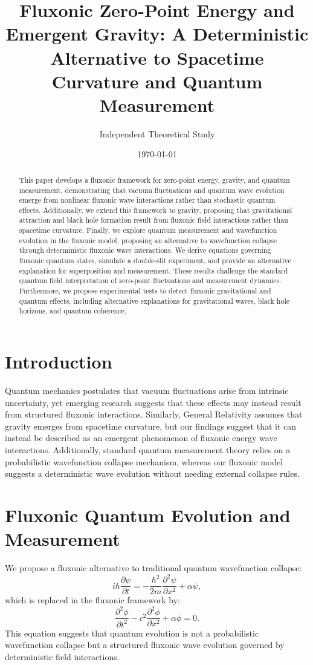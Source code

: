 \documentclass{article}
\title{Fluxonic Zero-Point Energy and Emergent Gravity: A Deterministic Alternative to Spacetime Curvature and Quantum Measurement}
\author{Independent Theoretical Study}
\date{\today}
\begin{document}
\maketitle

\begin{abstract}
This paper develops a fluxonic framework for zero-point energy, gravity, and quantum measurement, demonstrating that vacuum fluctuations and quantum wave evolution emerge from nonlinear fluxonic wave interactions rather than stochastic quantum effects. Additionally, we extend this framework to gravity, proposing that gravitational attraction and black hole formation result from fluxonic field interactions rather than spacetime curvature. Finally, we explore quantum measurement and wavefunction evolution in the fluxonic model, proposing an alternative to wavefunction collapse through deterministic fluxonic wave interactions. We derive equations governing fluxonic quantum states, simulate a double-slit experiment, and provide an alternative explanation for superposition and measurement. These results challenge the standard quantum field interpretation of zero-point fluctuations and measurement dynamics. Furthermore, we propose experimental tests to detect fluxonic gravitational and quantum effects, including alternative explanations for gravitational waves, black hole horizons, and quantum coherence.
\end{abstract}

\section{Introduction}
Quantum mechanics postulates that vacuum fluctuations arise from intrinsic uncertainty, yet emerging research suggests that these effects may instead result from structured fluxonic interactions. Similarly, General Relativity assumes that gravity emerges from spacetime curvature, but our findings suggest that it can instead be described as an emergent phenomenon of fluxonic energy wave interactions. Additionally, standard quantum measurement theory relies on a probabilistic wavefunction collapse mechanism, whereas our fluxonic model suggests a deterministic wave evolution without needing external collapse rules.

\section{Fluxonic Quantum Evolution and Measurement}
We propose a fluxonic alternative to traditional quantum wavefunction collapse:
\begin{equation}
    i\hbar \frac{\partial \psi}{\partial t} = -\frac{\hbar^2}{2m} \frac{\partial^2 \psi}{\partial x^2} + \alpha \psi,
\end{equation}
which is replaced in the fluxonic framework by:
\begin{equation}
    \frac{\partial^2 \phi}{\partial t^2} - c^2 \frac{\partial^2 \phi}{\partial x^2} + \alpha \phi = 0.
\end{equation}
This equation suggests that quantum evolution is not a probabilistic wavefunction collapse but a structured fluxonic wave evolution governed by deterministic field interactions.
\end{document}
